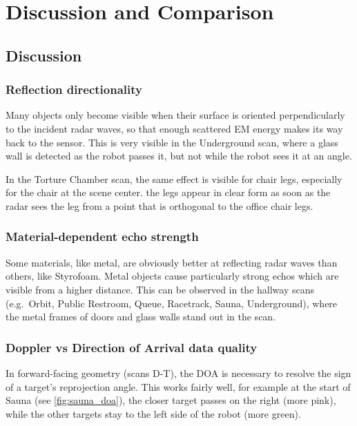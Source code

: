 \chapter{Discussion and Comparison}\label{discussion-and-comparison}

\section{Discussion}

\subsection{Reflection directionality}\label{reflection-directionality}

Many objects only become visible when their surface is oriented
perpendicularly to the incident radar waves, so that enough scattered EM
energy makes its way back to the sensor. This is very visible in the
Underground scan, where a glass wall is detected as the robot passes it,
but not while the robot sees it at an angle.

In the Torture Chamber scan, the same effect is visible for chair legs,
especially for the chair at the scene center. the legs appear in clear
form as soon as the radar sees the leg from a point that is orthogonal
to the office chair legs.



\subsection{Material-dependent echo strength}\label{material-dependent-echo-strength}

Some materials, like metal, are obviously better at reflecting radar
waves than others, like Styrofoam. Metal objects cause particularly
strong echos which are visible from a higher distance. This can be
observed in the hallway scans (e.g.~Orbit, Public Restroom, Queue,
Racetrack, Sauna, Underground), where the metal frames of doors and
glass walls stand out in the scan.

\subsection{Doppler vs Direction of Arrival data quality}\label{doppler-vs-direction-of-arrival-data-quality}

In forward-facing geometry (scans D-T), the DOA is necessary to resolve
the sign of a target's reprojection angle. This works fairly well, for
example at the start of Sauna (see \cref{fig:sauna_doa}), the closer target
passes on the right (more pink), while the other targets stay to the
left side of the robot (more green).

